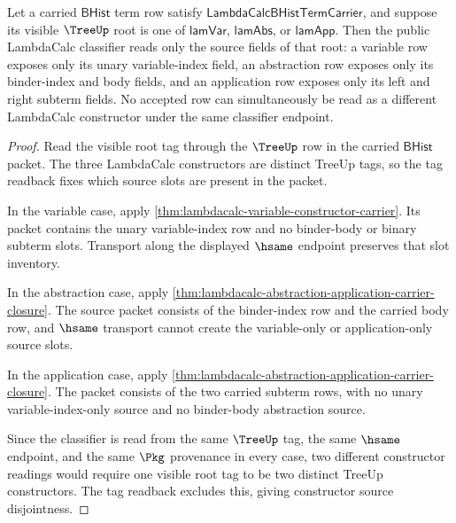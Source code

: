 \begin{theorem}
\label{thm:lambdacalc-constructor-source-disjointness}
Let a carried $\mathsf{BHist}$ term row satisfy
$\mathsf{LambdaCalcBHistTermCarrier}$, and suppose its visible $\TreeUp$ root is
one of $\mathsf{lamVar}$, $\mathsf{lamAbs}$, or $\mathsf{lamApp}$. Then the
public LambdaCalc classifier reads only the source fields of that root: a
variable row exposes only its unary variable-index field, an abstraction row
exposes only its binder-index and body fields, and an application row exposes
only its left and right subterm fields. No accepted row can simultaneously be
read as a different LambdaCalc constructor under the same classifier endpoint.
\end{theorem}
\begin{proof}
Read the visible root tag through the $\TreeUp$ row in the carried
$\mathsf{BHist}$ packet. The three LambdaCalc constructors are distinct
TreeUp tags, so the tag readback fixes which source slots are present in the
packet.

In the variable case, apply
\autoref{thm:lambdacalc-variable-constructor-carrier}. Its packet contains the
unary variable-index row and no binder-body or binary subterm slots. Transport
along the displayed $\hsame$ endpoint preserves that slot inventory.

In the abstraction case, apply
\autoref{thm:lambdacalc-abstraction-application-carrier-closure}. The source packet consists
of the binder-index row and the carried body row, and $\hsame$ transport cannot
create the variable-only or application-only source slots.

In the application case, apply
\autoref{thm:lambdacalc-abstraction-application-carrier-closure}. The packet consists of the
two carried subterm rows, with no unary variable-index-only source and no
binder-body abstraction source.

Since the classifier is read from the same $\TreeUp$ tag, the same $\hsame$
endpoint, and the same $\Pkg$ provenance in every case, two different
constructor readings would require one visible root tag to be two distinct
TreeUp constructors. The tag readback excludes this, giving constructor source
disjointness.
\end{proof}

